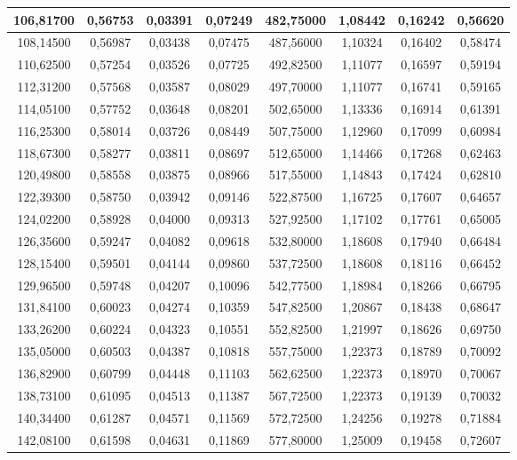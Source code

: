 \documentclass[a4paper,12pt]{article}
\numberwithin{equation}{section}
\begin{document}
\begin{appendices}
\begin{longtable}[c]{|c|c|c|c|c|c|c|c|}
106,81700	&	0,56753	&	0,03391	&	0,07249	&	482,75000	&	1,08442	&	0,16242	&	0,56620	\\\hline
108,14500	&	0,56987	&	0,03438	&	0,07475	&	487,56000	&	1,10324	&	0,16402	&	0,58474	\\\hline
110,62500	&	0,57254	&	0,03526	&	0,07725	&	492,82500	&	1,11077	&	0,16597	&	0,59194	\\\hline
112,31200	&	0,57568	&	0,03587	&	0,08029	&	497,70000	&	1,11077	&	0,16741	&	0,59165	\\\hline
114,05100	&	0,57752	&	0,03648	&	0,08201	&	502,65000	&	1,13336	&	0,16914	&	0,61391	\\\hline
116,25300	&	0,58014	&	0,03726	&	0,08449	&	507,75000	&	1,12960	&	0,17099	&	0,60984	\\\hline
118,67300	&	0,58277	&	0,03811	&	0,08697	&	512,65000	&	1,14466	&	0,17268	&	0,62463	\\\hline
120,49800	&	0,58558	&	0,03875	&	0,08966	&	517,55000	&	1,14843	&	0,17424	&	0,62810	\\\hline
122,39300	&	0,58750	&	0,03942	&	0,09146	&	522,87500	&	1,16725	&	0,17607	&	0,64657	\\\hline
124,02200	&	0,58928	&	0,04000	&	0,09313	&	527,92500	&	1,17102	&	0,17761	&	0,65005	\\\hline
126,35600	&	0,59247	&	0,04082	&	0,09618	&	532,80000	&	1,18608	&	0,17940	&	0,66484	\\\hline
128,15400	&	0,59501	&	0,04144	&	0,09860	&	537,72500	&	1,18608	&	0,18116	&	0,66452	\\\hline
129,96500	&	0,59748	&	0,04207	&	0,10096	&	542,77500	&	1,18984	&	0,18266	&	0,66795	\\\hline
131,84100	&	0,60023	&	0,04274	&	0,10359	&	547,82500	&	1,20867	&	0,18438	&	0,68647	\\\hline
133,26200	&	0,60224	&	0,04323	&	0,10551	&	552,82500	&	1,21997	&	0,18626	&	0,69750	\\\hline
135,05000	&	0,60503	&	0,04387	&	0,10818	&	557,75000	&	1,22373	&	0,18789	&	0,70092	\\\hline
136,82900	&	0,60799	&	0,04448	&	0,11103	&	562,62500	&	1,22373	&	0,18970	&	0,70067	\\\hline
138,73100	&	0,61095	&	0,04513	&	0,11387	&	567,72500	&	1,22373	&	0,19139	&	0,70032	\\\hline
140,34400	&	0,61287	&	0,04571	&	0,11569	&	572,72500	&	1,24256	&	0,19278	&	0,71884	\\\hline
142,08100	&	0,61598	&	0,04631	&	0,11869	&	577,80000	&	1,25009	&	0,19458	&	0,72607	\\\hline

\end{longtable}
\end{appendices}
\end{document}
